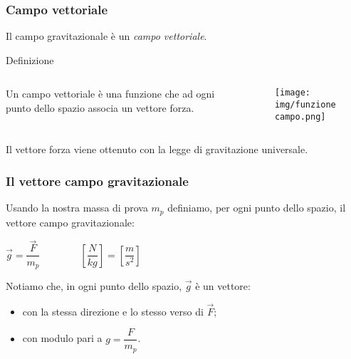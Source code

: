 \documentclass[]{beamer}
\theoremstyle{plain}
\begin{document}
\begin{frame}
\frametitle{Campo vettoriale}
Il campo gravitazionale è un \emph{campo vettoriale}.

\begin{block}{Definizione}
\begin{columns}
\begin{column}{0.4\textwidth}
Un campo vettoriale è una funzione che ad ogni punto dello spazio associa un vettore forza.
\end{column}
\begin{column}{0.4\textwidth}
\begin{figure}
\texttt{[image: img/funzionecampo.png]}
\end{figure}
\end{column}
\end{columns}
\end{block}

Il vettore forza viene ottenuto con la legge di gravitazione universale.
\end{frame}



\begin{frame}
\frametitle{Il vettore campo gravitazionale}
\begin{figure}
\end{figure}
Usando la nostra massa di prova $ m_p $ definiamo, per ogni punto dello spazio, il \alert{vettore campo gravitazionale}:

\begin{center}
\colorbox{blue!30}{$ \vec{g} = \dfrac{\vec{F}}{m_p} $}~~~~~~~~$ \left[\dfrac{N}{kg}\right] = \left[\dfrac{m}{s^2}\right]  $
\end{center}\pause
Notiamo che, in ogni punto dello spazio, \alert{$ \vec{g} $ è un vettore}:
\begin{itemize}
  \item con la stessa direzione e lo stesso verso di $ \vec{F} $;\pause
  \item con modulo pari a $ g = \dfrac{F}{m_p} $.
\end{itemize}
\end{frame}
\end{document}
